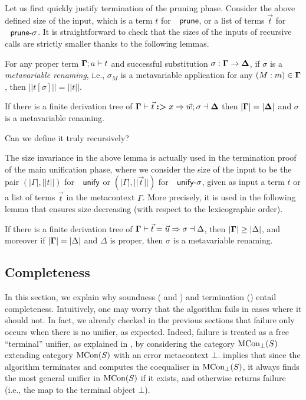 Let us first quickly justify termination of the pruning phase. Consider
the above defined size of the input, which is a term $t$ for $\AgdaFunction{prune}$,
or a list of terms $\vec{t}$ for $\AgdaFunction{prune-\ensuremath{\sigma}}$.
It is straightforward to check that the sizes of the inputs of recursive
calls are strictly smaller thanks to the following lemmas.
\begin{lemma}
For any proper term $\boldsymbol{\Gamma};a\vdash t$ and successful
substitution $\sigma:\boldsymbol{\Gamma}\rightarrow\boldsymbol{\Delta}$,
if $\sigma$ is a \emph{metavariable renaming}, i.e., $\sigma_{M}$
is a metavariable application for any $(M:m)\in\boldsymbol{\Gamma}$,
then $||t[\sigma]||=||t||$.
\end{lemma}
%
\begin{lemma}
If there is a finite derivation tree of $\boldsymbol{\Gamma}\vdash_{}\vec{t}\boldsymbol{:>}x\Rightarrow\vec{w};\sigma\dashv\boldsymbol{\Delta}$
 then $|\boldsymbol{\Gamma}|=|\boldsymbol{\Delta}|$ and $\sigma$
is a metavariable renaming.
\end{lemma}
\begin{personalquestion}
Can we define it truly recursively?
\end{personalquestion}
The size invariance in the above lemma is actually used in the termination
proof of the main unification phase, where we consider the size of
the input to be the pair $(|\Gamma|,||t||)$ for $\AgdaFunction{unify}$
or $(|\Gamma|,||\vec{t}||)$ for $\AgdaFunction{unify-\ensuremath{\sigma}}$,
given as input a term $t$ or a list of terms $\vec{t}$ in the metacontext
$\Gamma$. More precisely, it is used in the following lemma that
ensures size decreasing (with respect to the lexicographic order).

\begin{lemma}
If there is a finite derivation tree of $\boldsymbol{\Gamma}\vdash\vec{t}=\vec{u}\Rightarrow\sigma\dashv\Delta$,
then $|\boldsymbol{\Gamma}|\geq|\Delta|$, and moreover if $|\boldsymbol{\Gamma}|=|\Delta|$
and $\Delta$ is proper, then $\sigma$ is a metavariable renaming. 
\end{lemma}

\subsection{Completeness}

\label{subsec:completeness}

In this section, we explain why soundness (
and ) and termination ()
entail completeness. Intuitively, one may worry that the algorithm
fails in cases where it should not. In fact, we already checked in
the previous sections that failure only occurs when there is no unifier,
as expected. Indeed, failure is treated as a free ``terminal'' unifier,
as explained in , by considering the
category $\mathrm{MCon_{\bot}}(S)$ extending category $\mathrm{MCon}(S)$ with an error metacontext
$\bot$.  implies that since the algorithm
terminates and computes the coequaliser in $\mathrm{MCon_{\bot}}(S)$, it always
finds the most general unifier in $\mathrm{MCon}(S)$ if it exists, and otherwise
returns failure (i.e., the map to the terminal object $\bot$). 

